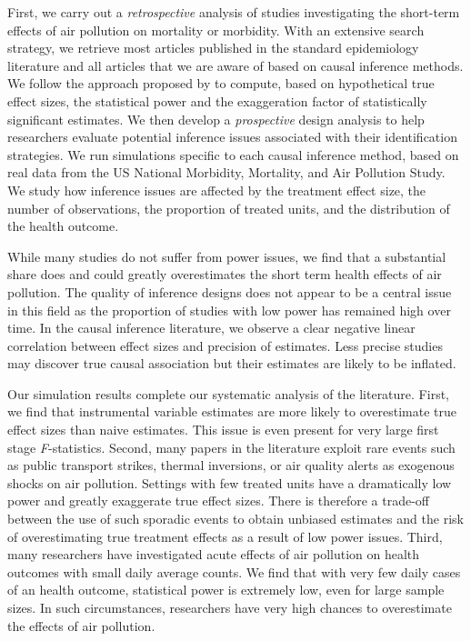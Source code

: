 \documentclass[12pt]{article}
\begin{document}
    First, we carry out a \textit{retrospective} analysis of studies investigating the short-term effects of air pollution on mortality or morbidity. With an extensive search strategy, we retrieve most articles published in the standard epidemiology literature and all articles that we are aware of based on causal inference methods. We follow the approach proposed by \cite{gelman_beyond_2014} to compute, based on hypothetical true effect sizes, the statistical power and the exaggeration factor of statistically significant estimates. We then develop a \textit{prospective} design analysis to help researchers evaluate potential inference issues associated with their identification strategies. We run simulations specific to each causal inference method, based on real data from the US National Morbidity, Mortality, and Air Pollution Study. We study how inference issues are affected by the treatment effect size, the number of observations, the proportion of treated units, and the distribution of the health outcome.
    
    While many studies do not suffer from power issues, we find that a substantial share does and could greatly overestimates the short term health effects of air pollution. The quality of inference designs does not appear to be a central issue in this field as the proportion of studies with low power has remained high over time. In the causal inference literature, we observe a clear negative linear correlation between effect sizes and precision of estimates. Less precise studies may discover true causal association but their estimates are likely to be inflated. 
    
    Our simulation results complete our systematic analysis of the literature. First, we find that instrumental variable estimates are more likely to overestimate true effect sizes than naive estimates. This issue is even present for very large first stage \textit{F}-statistics. Second, many papers in the literature exploit rare events such as public transport strikes, thermal inversions, or air quality alerts as exogenous shocks on air pollution. Settings with few treated units have a dramatically low power and greatly exaggerate true effect sizes. There is therefore a trade-off between the use of such sporadic events to obtain unbiased estimates and the risk of overestimating true treatment effects as a result of low power issues. Third, many researchers have investigated acute effects of air pollution on health outcomes with small daily average counts. We find that with very few daily cases of an health outcome, statistical power is extremely low, even for large sample sizes. In such circumstances, researchers have very high chances to overestimate the effects of air pollution.
    
\end{document}
